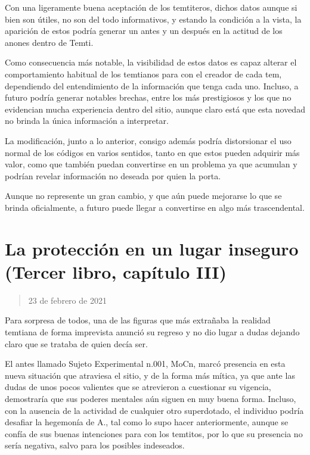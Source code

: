 \documentclass[
  spanish,
]{book}
\begin{document}
Con una ligeramente buena aceptación de los temtiteros, dichos datos aunque si bien son útiles, no son del todo informativos, y estando la condición a la vista, la aparición de estos podría generar un antes y un después en la actitud de los anones dentro de Temti.

Como consecuencia más notable, la visibilidad de estos datos es capaz alterar el comportamiento habitual de los temtianos para con el creador de cada tem, dependiendo del entendimiento de la información que tenga cada uno. Incluso, a futuro podría generar notables brechas, entre los más prestigiosos y los que no evidencian mucha experiencia dentro del sitio, aunque claro está que esta novedad no brinda la única información a interpretar.

La modificación, junto a lo anterior, consigo además podría distorsionar el uso normal de los códigos en varios sentidos, tanto en que estos pueden adquirir más valor, como que también puedan convertirse en un problema ya que acumulan y podrían revelar información no deseada por quien la porta.

Aunque no represente un gran cambio, y que aún puede mejorarse lo que se brinda oficialmente, a futuro puede llegar a convertirse en algo más trascendental.

\hypertarget{la-protecciuxf3n-en-un-lugar-inseguro-tercer-libro-capuxedtulo-iii}{%
\section{La protección en un lugar inseguro (Tercer libro, capítulo III)}\label{la-protecciuxf3n-en-un-lugar-inseguro-tercer-libro-capuxedtulo-iii}}

\begin{quote}
23 de febrero de 2021
\end{quote}

Para sorpresa de todos, una de las figuras que más extrañaba la realidad temtiana de forma imprevista anunció su regreso y no dio lugar a dudas dejando claro que se trataba de quien decía ser.

El antes llamado Sujeto Experimental n.001, MoCn, marcó presencia en esta nueva situación que atraviesa el sitio, y de la forma más mítica, ya que ante las dudas de unos pocos valientes que se atrevieron a cuestionar su vigencia, demostraría que sus poderes mentales aún siguen en muy buena forma. Incluso, con la ausencia de la actividad de cualquier otro superdotado, el individuo podría desafiar la hegemonía de A., tal como lo supo hacer anteriormente, aunque se confía de sus buenas intenciones para con los temtitos, por lo que su presencia no sería negativa, salvo para los posibles indeseados.
\end{document}

